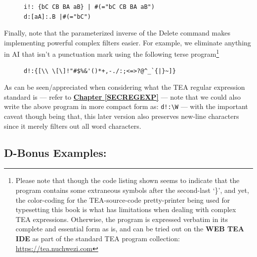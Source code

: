 \documentclass[a4paper, 18pt]{book} %
\begin{document}
 
 \begin{figure}[H]
 \Large
  \centering
  \begin{tcolorbox}[teaterminalstyle, title=TEA Program: D: with chained patterns]
  \begin{lstlisting}[language=TEA]
i!: {bC CB BA aB} | #(="bC CB BA aB")
d:[aA]:.B |#(="bC")
   \end{lstlisting}
  \end{tcolorbox}
\end{figure}


Finally, note that the parameterized inverse of the Delete command makes implementing powerful complex filters easier. For example, we eliminate anything in AI that isn't a punctuation mark using the following terse program\footnote{Please note that though the code listing shown seems to indicate that the program contains some extraneous symbols after the second-last `\}', and yet, the color-coding for the TEA-source-code pretty-printer being used for typesetting this book is what has limitations when dealing with complex TEA expressions. Otherwise, the program is expressed verbatim in its complete and essential form as is, and can be tried out on the \textbf{WEB TEA IDE} as part of the standard TEA program collection: \url{https://tea.nuchwezi.com}} 


 \begin{figure}[H]
 \Large
  \centering
  \begin{tcolorbox}[teaterminalstyle, title=TEA Program: De PUNCTURA Filter]
  \begin{lstlisting}[language=TEA]
d!:{[\\ \[\]!"#$%&'()*+,-./:;<=>?@^_`{|}~]} 
   \end{lstlisting}
  \end{tcolorbox}
\end{figure}

As can be seen/appreciated when considering what the TEA regular expression standard is --- refer to \textbf{\hyperref[SECREGEXP]{Chapter \ref{SECREGEXP}}} --- note that we could also write the above program in more compact form as: \texttt{d!:\textbackslash{}W} --- with the important caveat though being that, this later version also preserves new-line characters since it merely filters out all word characters.


\subsection{D-Bonus Examples:}
\end{document}
